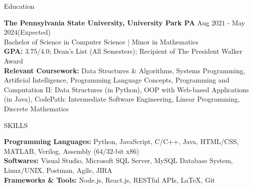 \documentclass{resume} %
\begin{document}

\begin{rSection}{Education}

{\bf The Pennsylvania State University, University Park PA} \hfill {Aug $2021$ - May $2024$(Expected)}\\
{Bachelor of Science in Computer Science $\vert$ Minor in Mathematics}\\
{\bf GPA:} $3.75/4.0$; Dean's List (All Semesters); Recipient of The President Walker Award\\
{\bf Relevant Coursework:} Data Structures \& Algorithms, Systems Programming, Artificial Intelligence, Programming Language Concepts, Programming and Computation II: Data Structures (in Python), OOP with Web-based Applications (in Java), CodePath: Intermediate Software Engineering, Linear Programming, Discrete Mathematics
\end{rSection}


\begin{rSection}{SKILLS}

{\bf Programming Languages:} Python, JavaScript, C/C++, Java, HTML/CSS, MATLAB, Verilog, Assembly ($64/32$-bit x$86$)\\
{\bf Softwares:} Visual Studio, Microsoft SQL Server, MySQL Database System, Linux/UNIX, Postman, Agile, JIRA\\
{\bf Frameworks \& Tools:} Node.js, React.js, RESTful APIs, \LaTeX, Git

\end{rSection}
\end{document}
